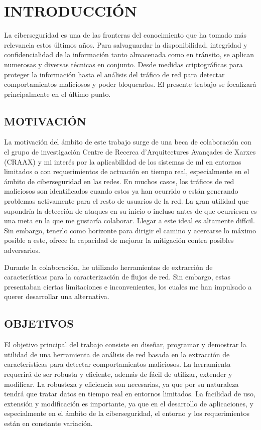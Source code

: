 \newpage
\pagestyle{plain}

\chapter{INTRODUCCIÓN}

La ciberseguridad es una de las fronteras del conocimiento que ha tomado más relevancia estos últimos años. Para salvaguardar la disponibilidad, integridad y confidencialidad de la información tanto almacenada como en tránsito, se aplican numerosas y diversas técnicas en conjunto. Desde medidas criptográficas para proteger la información hasta el análisis del tráfico de red para detectar comportamientos maliciosos y poder bloquearlos. El presente trabajo se focalizará principalmente en el último punto.

\section{MOTIVACIÓN}

La motivación del ámbito de este trabajo surge de una beca de colaboración con el grupo de investigación Centre de Recerca d'Arquitectures Avançades de Xarxes (CRAAX) y mi interés por la aplicabilidad de los sistemas de \gls{ml} en entornos limitados o con requerimientos de actuación en tiempo real, especialmente en el ámbito de ciberseguridad en las redes. En muchos casos, los tráficos de red maliciosos son identificados cuando estos ya han ocurrido o están generando problemas activamente para el resto de usuarios de la red. La gran utilidad que supondría la detección de ataques en su inicio o incluso antes de que ocurriesen es una meta en la que me gustaría colaborar. Llegar a este ideal es altamente difícil. Sin embargo, tenerlo como horizonte para dirigir el camino y acercarse lo máximo posible a este, ofrece la capacidad de mejorar la mitigación contra posibles adversarios.

Durante la colaboración, he utilizado herramientas de extracción de características para la caracterización de flujos de red. Sin embargo, estas presentaban ciertas limitaciones e inconvenientes, los cuales me han impulsado a querer desarrollar una alternativa.

\section{OBJETIVOS}

El objetivo principal del trabajo consiste en diseñar, programar y demostrar la utilidad de una herramienta de análisis de red basada en la extracción de características para detectar comportamientos maliciosos. La herramienta requerirá de ser robusta y eficiente, además de fácil de utilizar, extender y modificar. La robusteza y eficiencia son necesarias, ya que por su naturaleza tendrá que tratar datos en tiempo real en entornos limitados. La facilidad de uso, extensión y modificación es importante, ya que en el desarrollo de aplicaciones, y especialmente en el ámbito de la ciberseguridad, el entorno y los requerimientos están en constante variación.

